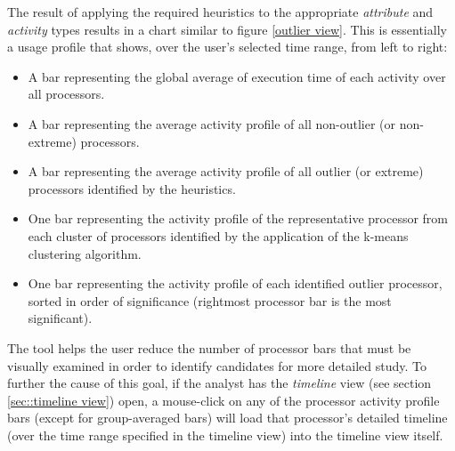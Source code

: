 The result of applying the required heuristics to the appropriate {\em
attribute} and {\em activity} types results in a chart similar to
figure \ref{outlier view}. This is essentially a usage profile that
shows, over the user's selected time range, from left to right:

\begin{itemize}
\item A bar representing the global average of execution time of each
activity over all processors.
\item A bar representing the average activity profile of all
non-outlier (or non-extreme) processors.
\item A bar representing the average activity profile of all outlier
(or extreme) processors identified by the heuristics.
\item One bar representing the activity profile of the representative
processor from each cluster of processors identified by the application
of the k-means clustering algorithm.
\item One bar representing the activity profile of each identified
outlier processor, sorted in order of significance (rightmost processor
bar is the most significant).
\end{itemize}

The tool helps the user reduce the number of processor bars that must
be visually examined in order to identify candidates for more detailed
study. To further the cause of this goal, if the analyst has the {\em
timeline} view (see section \ref{sec::timeline view}) open, a
mouse-click on any of the processor activity profile bars (except for
group-averaged bars) will load that processor's detailed timeline
(over the time range specified in the timeline view) into the timeline
view itself.



